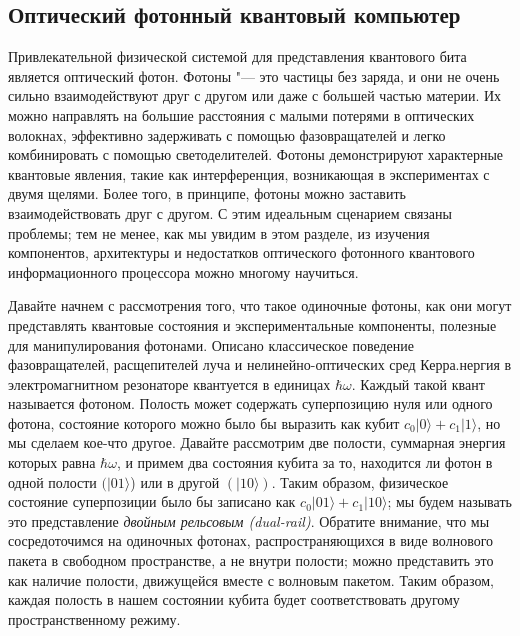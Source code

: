 \begin{multicols}{2}
    \section*{Оптический фотонный квантовый компьютер}
    \normalsize{
        Привлекательной физической системой для представления квантового бита является оптический фотон. Фотоны "--- это частицы без заряда, и они не очень сильно взаимодействуют друг с другом или даже
        с большей частью материи. Их можно направлять на большие расстояния с малыми потерями в оптических волокнах,
        эффективно задерживать с помощью фазовращателей и легко комбинировать с помощью светоделителей. Фотоны
        демонстрируют характерные квантовые явления, такие как интерференция, возникающая в экспериментах с двумя щелями. Более того, в принципе, фотоны можно заставить взаимодействовать друг с другом.
        С этим идеальным сценарием связаны проблемы; тем не менее,
        как мы увидим в этом разделе, из изучения компонентов, архитектуры и недостатков оптического фотонного квантового информационного процессора можно многому научиться.

        Давайте начнем с рассмотрения того, что такое одиночные фотоны, как они могут представлять квантовые
        состояния и экспериментальные компоненты, полезные для манипулирования фотонами. Описано классическое
        поведение фазовращателей, расщепителей луча и нелинейно-оптических сред Керра.нергия в электромагнитном резонаторе квантуется
        в единицах $\hbar\omega$. Каждый такой квант называется фотоном. Полость может 
        содержать суперпозицию нуля или одного фотона, состояние которого можно было бы выразить как кубит
        $c_0\vert0\rangle+c_1\vert1\rangle$, но мы сделаем кое-что другое. Давайте рассмотрим две полости,
        суммарная энергия которых равна $\hbar\omega$, и примем два состояния кубита за то, находится ли фотон в одной полости $(\vert01\rangle$) или в другой $(\vert10\rangle)$. 
        Таким образом, физическое состояние суперпозиции было
        бы записано как $c_0\vert01\rangle+c_1\vert10\rangle$; мы будем называть это представление \emph{двойным рельсовым (dual-rail)}. 
        Обратите внимание, что мы сосредоточимся на одиночных фотонах, распространяющихся в виде волнового пакета в свободном пространстве, а не
        внутри полости; можно представить это как наличие полости, движущейся вместе с волновым пакетом. Таким образом, каждая полость в нашем состоянии кубита будет соответствовать другому пространственному режиму.

}
\end{multicols}
